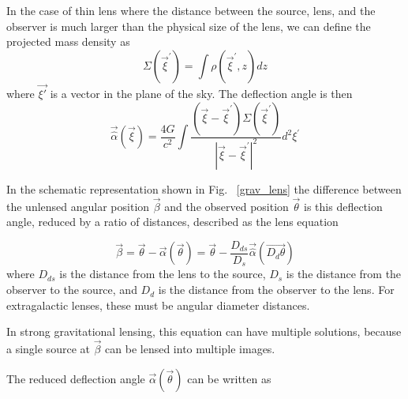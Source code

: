 In the case of thin lens where the distance between the source, lens, and the observer is much larger than the physical size of the lens, we can define the projected mass density as 
\begin{equation}
{\displaystyle \Sigma ({\vec {\xi }}^{\prime })=\int \rho ({\vec {\xi }}^{\prime },z)dz}
\end{equation}
where $\vec{\xi'}$ is a vector in the plane of the sky. The deflection angle is then
\begin{equation}
{\displaystyle {\vec {\hat {\alpha }}}({\vec {\xi }})={\frac {4G}{c^{2}}}\int {\frac {({\vec {\xi }}-{\vec {\xi }}^{\prime })\Sigma ({\vec {\xi }}^{\prime })}{|{\vec {\xi }}-{\vec {\xi }}^{\prime }|^{2}}}d^{2}\xi ^{\prime }}
\end{equation}

In the schematic representation shown in Fig. ~\ref{grav_lens} the difference between the unlensed angular position $\vec{\beta}$ and the observed position $\vec{\theta}$ is this deflection angle, reduced by a ratio of distances, described as the lens equation

\begin{equation}
{\displaystyle {\vec {\beta }}={\vec {\theta }}-{\vec {\alpha }}({\vec {\theta }})={\vec {\theta }}-{\frac {D_{ds}}{D_{s}}}{\vec {\hat {\alpha }}}({\vec {D_{d}\theta }})}%
\end{equation}
where ${\displaystyle D_{ds}}$ is the distance from the lens to the source, ${\displaystyle D_{s}}$ is the distance from the observer to the source, and ${\displaystyle D_{d}}$ is the distance from the observer to the lens. For extragalactic lenses, these must be angular diameter distances.

In strong gravitational lensing, this equation can have multiple solutions, because a single source at ${\displaystyle {\vec {\beta}}}$ can be lensed into multiple images.

The reduced deflection angle $\vec{\alpha}(\vec{\theta})$ can be written as

